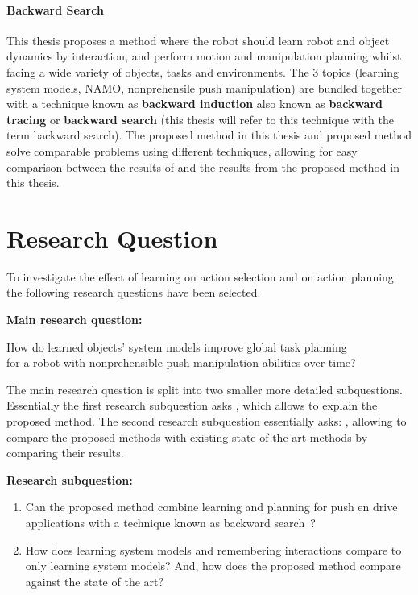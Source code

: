 \paragraph{Backward Search}
This thesis proposes a method where the robot should learn robot and object dynamics by interaction, and perform motion and manipulation planning whilst facing a wide variety of objects, tasks and environments. The 3 topics (learning system models, \ac{NAMO}, nonprehensile push manipulation) are bundled together with a technique known as \textbf{backward induction} also known as \textbf{backward tracing} or \textbf{backward search} (this thesis will refer to this technique with the term backward search). The proposed method in this thesis and \citeauthor{sabbaghnovin_model_2021} proposed method solve comparable problems using different techniques, allowing for easy comparison between the results of \citeauthor{sabbaghnovin_model_2021} and the results from the proposed method in this thesis.\bs
{}

\section{Research Question}%
\label{sec:research_question}
To investigate the effect of learning on action selection and on action planning the following research questions have been selected.\bs

\textbf{Main research question:}
\begin{center}%
\label{researchquestion:main}
\large
How do learned objects' system models improve global task planning\\for a robot with nonprehensible push manipulation abilities over time?
\end{center}

The main research question is split into two smaller more detailed subquestions. Essentially the first research subquestion asks , which allows to explain the proposed method. The second research subquestion essentially asks: , allowing to compare the proposed methods with existing state-of-the-art methods by comparing their results.\bs

\textbf{Research subquestion:}
\begin{enumerate}
    \item\label{researchsubquestion:does_it_work} Can the proposed method combine learning and planning for push en drive applications with a technique known as backward search~\cite{krontiris_dealing_2015}?
    \item\label{researchsubquestion:does_it_compare} How does learning system models and remembering interactions compare to only learning system models? And, how does the proposed method compare against the state of the art?
\end{enumerate}

